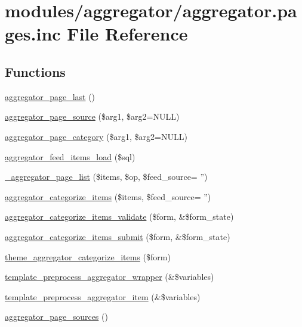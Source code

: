 \hypertarget{aggregator_8pages_8inc}{
\section{modules/aggregator/aggregator.pages.inc File Reference}
\label{aggregator_8pages_8inc}
}
\subsection*{Functions}
\begin{CompactItemize}
\item 
\hyperlink{aggregator_8pages_8inc_59d236d98e0725864c55ccf6f1ec7eab}{aggregator\_\-page\_\-last} ()
\item 
\hyperlink{aggregator_8pages_8inc_be514d3b7eb4d9fe3c9e8cca4ae8f155}{aggregator\_\-page\_\-source} (\$arg1, \$arg2=NULL)
\item 
\hyperlink{aggregator_8pages_8inc_69a965de4121426852ef208e064119bc}{aggregator\_\-page\_\-category} (\$arg1, \$arg2=NULL)
\item 
\hyperlink{aggregator_8pages_8inc_3009454bf1b054a8b8a385a3a8a36b79}{aggregator\_\-feed\_\-items\_\-load} (\$sql)
\item 
\hyperlink{aggregator_8pages_8inc_825e07217628ea623b6392c5a38d94f6}{\_\-aggregator\_\-page\_\-list} (\$items, \$op, \$feed\_\-source= '')
\item 
\hyperlink{group__forms_gd110881d125af4a6c5c2182a52fe4c69}{aggregator\_\-categorize\_\-items} (\$items, \$feed\_\-source= '')
\item 
\hyperlink{aggregator_8pages_8inc_e71e8db5c9acc1c94e1d3f30245525d0}{aggregator\_\-categorize\_\-items\_\-validate} (\$form, \&\$form\_\-state)
\item 
\hyperlink{aggregator_8pages_8inc_04d005d45c0430ec3b97884ef4470d4f}{aggregator\_\-categorize\_\-items\_\-submit} (\$form, \&\$form\_\-state)
\item 
\hyperlink{group__themeable_gd4db01ba5914e1aba833f470ac41e184}{theme\_\-aggregator\_\-categorize\_\-items} (\$form)
\item 
\hyperlink{aggregator_8pages_8inc_95bcd00a54c249668f911199fa8021ba}{template\_\-preprocess\_\-aggregator\_\-wrapper} (\&\$variables)
\item 
\hyperlink{aggregator_8pages_8inc_98e977c5fd28c4e808be5786a3f9e805}{template\_\-preprocess\_\-aggregator\_\-item} (\&\$variables)
\item 
\hyperlink{aggregator_8pages_8inc_d0ef3a50612adec65e464214ce643bf6}{aggregator\_\-page\_\-sources} ()

\end{CompactItemize}
